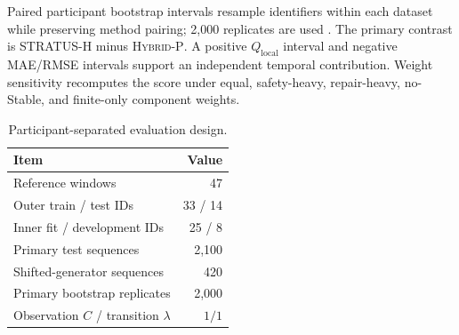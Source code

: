 \documentclass[sigconf,review]{acmart}
\newcommand{\methodHP}{\textsc{Hybrid-P}\xspace}
\newcommand{\methodH}{\textsc{STRATUS-H}\xspace}
\begin{document}
Paired participant bootstrap intervals resample identifiers within each
dataset while preserving method pairing; 2,000 replicates are used
\cite{efron1993bootstrap}. The primary contrast is \methodH minus
\methodHP. A positive $Q_{\mathrm{local}}$ interval and negative
MAE/RMSE intervals support an independent temporal contribution. Weight
sensitivity recomputes the score under equal, safety-heavy, repair-heavy,
no-Stable, and finite-only component weights.

\begin{table}[h]
\centering
\caption{Participant-separated evaluation design.}
\label{tab:evaluation_design}
\small
\begin{tabular}{lr}
\toprule
Item & Value \\
\midrule
Reference windows & 47 \\
Outer train / test IDs & 33 / 14 \\
Inner fit / development IDs & 25 / 8 \\
Primary test sequences & 2,100 \\
Shifted-generator sequences & 420 \\
Primary bootstrap replicates & 2,000 \\
Observation $C$ / transition $\lambda$ & $1/1$ \\
\bottomrule
\end{tabular}
\end{table}
\end{document}
